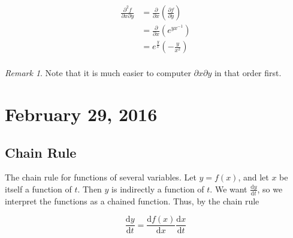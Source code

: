 \documentclass[11pt]{article}
\theoremstyle{plain} %
\theoremstyle{definition}
\theoremstyle{example}
\theoremstyle{remark}
\newtheorem*{remark}{Remark}
\begin{document}
\begin{align*}
	\frac{\partial^2 f}{\partial x \partial y} &= \frac{\partial}{\partial x}\left(\frac{\partial f}{\partial y} \right)\\
	&=  \frac{\partial}{\partial x}\left(e^{yx^{-1}}\right)\\
	&=e^{\frac{y}{x}}\left(-\frac{y}{x^2}\right)\\
\end{align*}

\begin{remark}
Note that it is much easier to computer $\partial x \partial y$ in that order first.
\end{remark}


















































\section{February 29, 2016}
\subsection{Chain Rule}

The chain rule for functions of several variables. Let $y = f(x)$, and let $x$ be itself a function of $t$. Then $y$ is indirectly a function of $t$. We want $\frac{\mathrm d y}{\mathrm d t}$, so we interpret the functions as a chained function. Thus, by the chain rule

$$\frac{\mathrm d y}{\mathrm d t} =\frac{\mathrm d f(x)}{\mathrm d x}\frac{\mathrm d x}{\mathrm d t}$$
\end{document}

